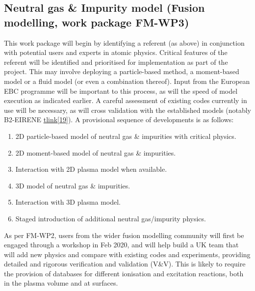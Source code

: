 \documentclass[a4paper]{article}
\newcommand\liststyleWWNumxi{%
\renewcommand\theenumi{\arabic{enumi}}
\renewcommand\theenumii{\alph{enumii}}
\renewcommand\theenumiii{\roman{enumiii}}
\renewcommand\theenumiv{\arabic{enumiv}}
\renewcommand\labelenumi{\theenumi.}
\renewcommand\labelenumii{\theenumii.}
\renewcommand\labelenumiii{\theenumiii.}
\renewcommand\labelenumiv{\theenumiv.}
}
\begin{document}
\subsection[Neutral gas \& Impurity model (Fusion modelling, work package
FM-WP3)]{\textbf{\textcolor[rgb]{0.12156863,0.28627452,0.49019608}{Neutral 
gas \& Impurity
model}}\textcolor[rgb]{0.12156863,0.28627452,0.49019608}{ (Fusion modelling, 
work package
}\textbf{\textcolor[rgb]{0.12156863,0.28627452,0.49019608}{FM-WP3}}\textcolor[rg
b]{0.12156863,0.28627452,0.49019608}{)}}

\bigskip

This work package will begin by identifying a referent (as above) in 
conjunction with potential users and experts in
atomic physics. Critical features of the referent will be identified and 
prioritised for implementation as part of the
project. This may involve deploying a particle-based method, a moment-based 
model or a fluid model (or even a
combination thereof). Input from the European EBC programme will be important 
to this process, as will the speed of
model execution as indicated earlier. A careful assessment of existing codes 
currently in use {will be
necessary, as will cross validation with the established models (notably 
B2-EIRENE
}\href{https://www.tandfonline.com/doi/abs/10.13182/FST47-172}{\textstyleInterne
tlink{{[19]}}}{).
A provisional }sequence of developments is as follows:


\bigskip

\liststyleWWNumxi
\begin{enumerate}
\item 2D particle-based model of neutral gas \& impurities with critical 
physics.
\item 2D moment-based model of neutral gas \& impurities.
\item Interaction with 2D plasma model when available.
\item 3D model of neutral gas \& impurities.
\item Interaction with 3D plasma model.
\item Staged introduction of additional neutral gas/impurity physics.
\end{enumerate}

\bigskip

As per FM-WP2, users from the wider fusion modelling community will first be 
engaged through a workshop in Feb 2020, and
will help build a UK team that will add new physics and compare with existing 
codes and experiments, providing detailed
and rigorous verification and validation (V\&V). This is likely to require the 
provision of databases for different
ionisation and excitation reactions, both in the plasma volume and at surfaces.
\end{document}
